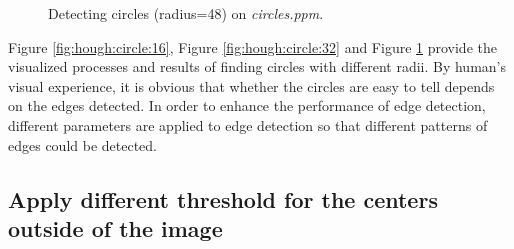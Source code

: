 \documentclass[paper=a4, fontsize=11pt]{scrartcl}
\begin{document}
\begin{figure}[h]
\centering
{}
\caption{Detecting circles (radius=48) on \emph{circles.ppm}.}
\label{fig:hough:circle:48}
\end{figure}

Figure \ref{fig:hough:circle:16}, Figure \ref{fig:hough:circle:32} and Figure \ref{fig:hough:circle:48} provide the visualized processes and results of finding circles with different radii.
By human's visual experience, it is obvious that whether the circles are easy to tell depends on the edges detected.
In order to enhance the performance of edge detection, different parameters are applied to edge detection so that different patterns of edges could be detected.

\subsection{Apply different threshold for the centers outside of the image}
\end{document}
